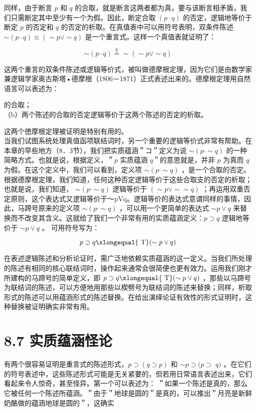 同样，由于断言 $p$ 和 $q$ 的合取，就是断言这两者都为真，要与该断言相矛盾，我们只需断定其中至少有一个为假。因此，断定合取 $(p \cdot q)$ 的否定，逻辑地等价于断定 $p$ 的否定和 $q$ 的否定的析取。在真值表中可以用符号表明，双条件陈述 $\sim(p \cdot q) \equiv(\sim p \vee \sim q)$ 是一个重言式。这样一个真值表就证明了：

$$
\sim(p \cdot q) \stackrel{\mathrm{T}}{=} \sim(\sim p \vee \sim q)
$$

这两个重言的双条件陈述或逻辑等价式，被叫做德摩根定理，因为它们是由数学家兼逻辑学家奥古斯塔•德摩根（1806－1871）正式表述出来的。德摩根定理用自然语言可以表述为：

的合取；\\
（b）两个陈述的合取的否定逻辑等价于这两个陈述的否定的析取。

这两个徳摩根定理被证明是特别有用的。\\
当我们试图系统处理真值函项联结词时，另一个重要的逻辑等价式非常有帮助。在本章的早些地方（8．3节），我们把实质蕴涵＂コ＂定义为说 $\sim(p \cdot \sim q)$ 的一种简略方式。也就是说，根据定义，＂$p$ 实质蕴涵 $q$＂的意思就是，并非 $p$ 为真而 $q$ 为假。在这个定义中，我们可以看到，定义项 $\sim(p \cdot \sim q)$ ，是一个合取的否定。根据德摩根定理，我们知道，任何这种否定逻辑等价于这些合取支的否定的析取；也就是说，我们知道， $\sim(p \cdot \sim q)$ 逻辑等价于 $(\sim p \vee \sim \sim q)$ ；再运用双重否定原则，这个表达式又逻辑等价于～pVq。逻辑等价的表达式意谓同样的事情，因此，马蹄号原来的定义项 $\sim(p \cdot \sim q)$ ，可以用一个更简单的表达式 $\sim p \vee q$ 来替换而不改变其含义。这就给了我们一个非常有用的实质蕴涵定义：$p \supset q$ 逻辑地等价于 $\sim p \vee q$ 。 可用符号写为：

$$
p \supset q \xlongequal{\mathrm{~T}}(\sim p \vee q)
$$

在表述逻辑陈述和分析论证时，需广泛地依赖实质蕴涵的这一定义。当我们所处理的陈述有相同的核心联结词时，操作起来通常会很简便也更有效力。运用我们刚才所建构的马蹄号的简单定义，即 $p \supset q \xlongequal{\mathrm{~T}}(\sim p \vee q)$ ，那些以马蹄号为联结词的陈述，可以方便地用那些以楔劈号为联结词的陈述来替换；同样，析取形式的陈述可以用蕴涵形式的陈述替换。在给出演绎论证有效性的形式证明时，这种替换被证明确实非常有用。

\section*{8.7 实质蕴涵怪论}
有两个很容易证明是重言式的陈述形式，$p \supset(q \supset p)$ 和 $\sim p \supset(p \supset$ $q)$ 。在它们的符号表述中，这些陈述形式可能是无关紧要的，但若用日常语言表述出来，它们看起来令人惊奇，甚至怪异。第一个可以表述为： ＂如果一个陈述是真的，那么它被任何一个陈述所蕴涵。＂由于＂地球是圆的＂是真的，可以推出＂月亮是新鲜奶酪做的蕴涵地球是圆的＂，这确实


